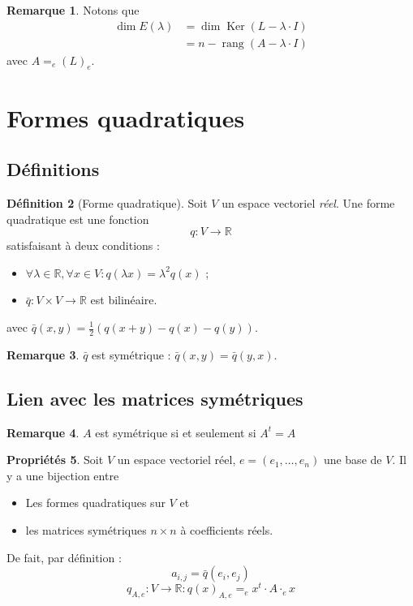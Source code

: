 \documentclass[11pt,a4paper]{article}
\theoremstyle{definition}
\newtheorem{mydef}{Définition}[section]
\newtheorem{myprop}[mydef]{Propriétés}
\newtheorem{myrem}[mydef]{Remarque}
\newcommand{\R}{\mathbb{R}}
\DeclareMathOperator{\newker}{Ker}
\DeclareMathOperator{\newdim}{dim}
\DeclareMathOperator{\newrang}{rang}
\begin{document}
\begin{myrem}
Notons que
 \begin{align*} \newdim E(\lambda) & = \newdim \newker (L - \lambda \cdot I) \\ & = n - \newrang (A - \lambda \cdot I) \end{align*}
avec $A = _e\!(L)_e$.
\end{myrem}


\section{Formes quadratiques}

\subsection{Définitions}

\begin{mydef}[Forme quadratique]
Soit $V$ un espace vectoriel \emph{réel}. Une forme quadratique est une fonction
\[ q : V \rightarrow \R \]
satisfaisant à deux conditions :
\begin{itemize}
\item $\forall \lambda \in \R, \forall x \in V : q(\lambda x) = \lambda^2 q(x)$ ;
\item $\bar{q} : V \times V \rightarrow \R$ est bilinéaire.
\end{itemize}
avec $\bar{q}(x,y) = \frac 12 (q(x+y) - q(x) - q(y) )$.
\end{mydef}

\begin{myrem} $\bar{q}$ est symétrique : $\bar{q}(x,y) = \bar{q}(y,x)$. \end{myrem}

\subsection{Lien avec les matrices symétriques}

\begin{myrem} $A$ est symétrique si et seulement si $A^t = A$ \end{myrem}

\begin{myprop} Soit $V$ un espace vectoriel réel, $e = (e_1, \dots , e_n)$ une base de $V$. Il y a une bijection entre
\begin{itemize}
\item Les formes quadratiques sur $V$ et
\item les matrices symétriques $n \times n$ à coefficients réels.
\end{itemize}
De fait, par définition :
\[ a_{i,j} = \bar{q}(e_i, e_j) \]
\[ q_{A,e} : V \rightarrow \R : q(x)_{A,e} = _e\!x^t \cdot A \cdot _e\!x \]
\end{myprop}
\end{document}
